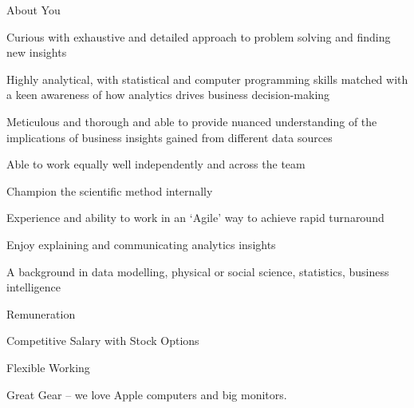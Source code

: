 About You

Curious with exhaustive and detailed approach to problem solving and finding new insights

Highly analytical, with statistical and computer programming skills matched with a keen awareness
of how analytics drives business decision-making

Meticulous and thorough and able to provide nuanced understanding of the implications of business
insights gained from different data sources

Able to work equally well independently and across the team

Champion the scientific method internally

Experience and ability to work in an ‘Agile’ way to achieve rapid turnaround

Enjoy explaining and communicating analytics insights

A background in data modelling, physical or social science, statistics, business intelligence

Remuneration

Competitive Salary with Stock Options

Flexible Working

Great Gear – we love Apple computers and big monitors.

